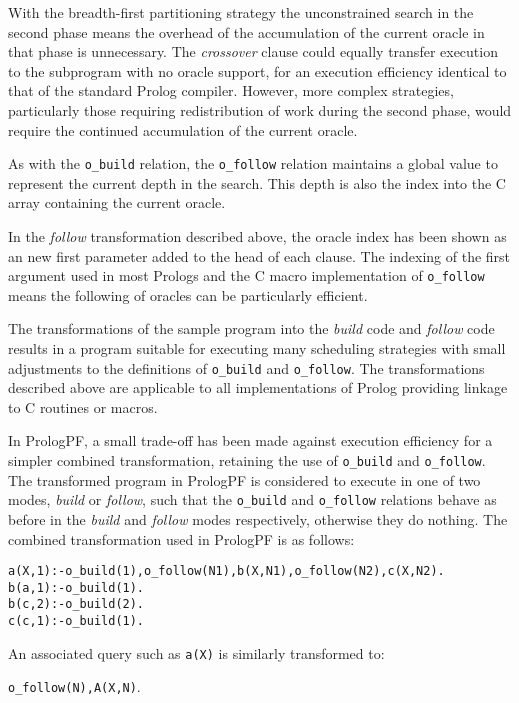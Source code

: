 With the breadth-first partitioning strategy the unconstrained search in the
second phase means the overhead of the accumulation of the current oracle in
that phase is unnecessary.  The \textit{crossover} clause could equally
transfer execution to the subprogram with no oracle support, for an
execution efficiency identical to that of the standard Prolog compiler.
However, more complex strategies, particularly those requiring
redistribution of work during the second phase, would require the continued
accumulation of the current oracle.

As with the \texttt{o\_{}build} relation, the \texttt{o\_{}follow} relation maintains a global value
to represent the current depth in the search.  This depth is also the index into the C array 
containing the current oracle.

In the \textit{follow} transformation described above, the oracle index has been shown as an 
new first parameter added to the head of each clause.  The indexing of the first argument used in
most Prologs and the C macro implementation of \texttt{o\_{}follow} means the following of oracles
can be particularly efficient.

The transformations of the sample program into the \textit{build} code and \textit{follow} code
results in a program suitable for executing many scheduling strategies with small adjustments to
the definitions of \texttt{o\_{}build} and \texttt{o\_{}follow}.
The transformations described above are applicable to all implementations of Prolog providing
linkage to C routines or macros.

In PrologPF, a small trade-off has been made against execution efficiency for a simpler combined
transformation, retaining the use of \texttt{o\_{}build} and \texttt{o\_{}follow}.  The transformed
program in PrologPF is considered to execute in one of two modes, \textit{build} or
\textit{follow}, such that the \texttt{o\_{}build} and \texttt{o\_{}follow} relations behave as
before in the \textit{build} and \textit{follow} modes respectively, otherwise they do nothing.
The combined transformation used in PrologPF is as follows:
\begin{alltt}
a(X,1) :- o_build(1), o_follow(N1), b(X,N1), o_follow(N2), c(X,N2).\vspace{2mm}
b(a,1) :- o_build(1).
b(c,2) :- o_build(2).\vspace{2mm}
c(c,1) :- o_build(1).
\end{alltt}

An associated query such as \texttt{a(X)} is similarly transformed to:\\
\centerline{\texttt{o\_{}follow(N),A(X,N)}.}

